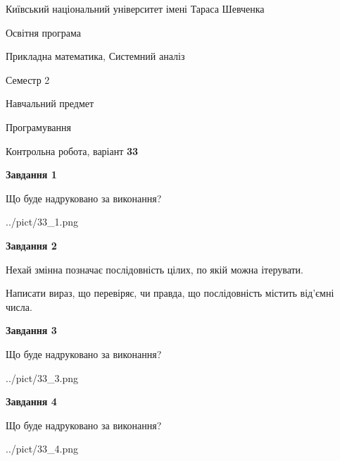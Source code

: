 \documentclass[12pt, ukrainian]{article}
\begin{document}
{{\begin {small}\par
{ \center  Київський національний університет імені Тараса Шевченка \par}
{\parbox {5 cm}{Освітня програма \hfill}{\parbox {8 cm}{Прикладна математика, Системний аналіз \hfill}}\parbox {5 cm}{\hfill Семестр 2}}\par
{\parbox {5 cm} {Навчальний предмет \hfill}\parbox {7 cm}{Програмування \hfill}\parbox {6cm}{\hfill}\par}\vspace{-7pt} \end{small}}{\center Контрольна робота, варіант  \No \textbf
{ 33 }\par}}
{
\begin {large}
{\begin {center}\textbf{Завдання 1}\end {center}}\par
Що буде надруковано за виконання?\par\par
\begin{center}
	{../pict/33_1.png}
\end{center}
\newpage

{\begin {center}\textbf{Завдання 2}\end {center}}\par
Нехай змінна  позначає послідовність цілих, по якій можна ітерувати.

Написати вираз, що перевіряє, чи правда, що послідовність  містить від’ємні числа.\par
\newpage

{\begin {center}\textbf{Завдання 3}\end {center}}\par
Що буде надруковано за виконання?\par
\begin{center}
	{../pict/33_3.png}
\end{center}
\newpage

{\begin {center}\textbf{Завдання 4}\end {center}}\par
Що буде надруковано за виконання?\par
\begin{center}
	{../pict/33_4.png}
\end{center}
\newpage


\end{large}}
\end{document}
